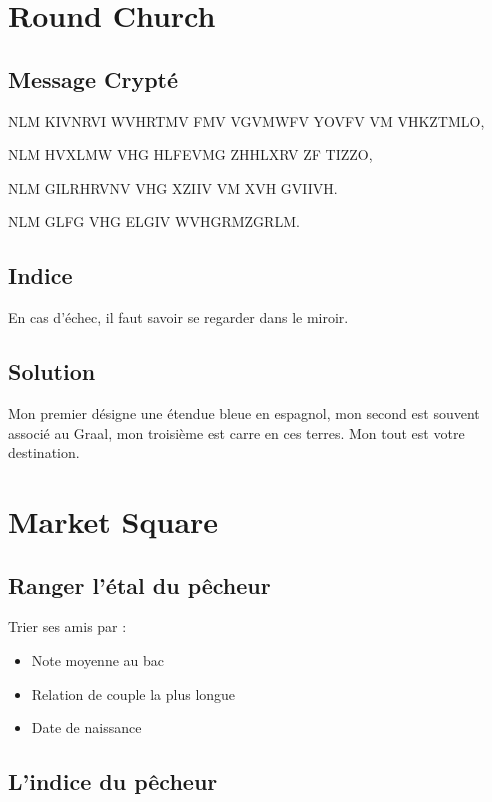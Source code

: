 \documentclass[12pt]{article}
\begin{document}
\section{Round Church}

\subsection{Message Crypté}

NLM KIVNRVI WVHRTMV FMV VGVMWFV YOVFV VM VHKZTMLO,   

NLM HVXLMW VHG HLFEVMG ZHHLXRV ZF TIZZO,   

NLM GILRHRVNV VHG XZIIV VM XVH GVIIVH.   

NLM GLFG VHG ELGIV WVHGRMZGRLM.

\subsection{Indice}

En cas d'échec, il faut savoir se regarder dans le miroir. 

\subsection{Solution}

Mon premier désigne une étendue bleue en espagnol, mon second est souvent associé au Graal, mon troisième est carre en ces terres. Mon tout est votre destination.

\section{Market Square}


\subsection{Ranger l'étal du pêcheur}

Trier ses amis par :
\begin{itemize}
  \item Note moyenne au bac
  \item Relation de couple la plus longue
  \item Date de naissance
\end{itemize}

\subsection{L'indice du pêcheur}
\end{document}
